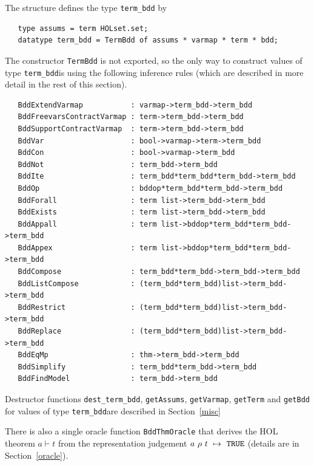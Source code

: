 \documentclass[12pt,fleqn]{article}
\renewcommand{\t}[1]{\mbox{\tt #1}}
\newcommand{\termbdd}[4]{\mbox{$#1~#2~#3~\mapsto~#4$}}
\newcommand\termbddty{\texttt{term\_bdd}{}}
\begin{document}
The structure  defines the type \termbddty{} by

\vspace*{-2mm}

\begin{verbatim}
   type assums = term HOLset.set;
   datatype term_bdd = TermBdd of assums * varmap * term * bdd;
\end{verbatim}

\vspace*{-2mm}

The constructor \t{TermBdd} is not exported, so the only way to construct
values of type \termbddty is using the following inference rules
(which are described in more detail in the rest of this section).

\begin{verbatim}
   BddExtendVarmap           : varmap->term_bdd->term_bdd
   BddFreevarsContractVarmap : term->term_bdd->term_bdd
   BddSupportContractVarmap  : term->term_bdd->term_bdd
   BddVar                    : bool->varmap->term->term_bdd
   BddCon                    : bool->varmap->term_bdd
   BddNot                    : term_bdd->term_bdd
   BddIte                    : term_bdd*term_bdd*term_bdd->term_bdd
   BddOp                     : bddop*term_bdd*term_bdd->term_bdd
   BddForall                 : term list->term_bdd->term_bdd
   BddExists                 : term list->term_bdd->term_bdd
   BddAppall                 : term list->bddop*term_bdd*term_bdd->term_bdd
   BddAppex                  : term list->bddop*term_bdd*term_bdd->term_bdd
   BddCompose                : term_bdd*term_bdd->term_bdd->term_bdd
   BddListCompose            : (term_bdd*term_bdd)list->term_bdd->term_bdd
   BddRestrict               : (term_bdd*term_bdd)list->term_bdd->term_bdd
   BddReplace                : (term_bdd*term_bdd)list->term_bdd->term_bdd
   BddEqMp                   : thm->term_bdd->term_bdd
   BddSimplify               : term_bdd*term_bdd->term_bdd
   BddFindModel              : term_bdd->term_bdd
\end{verbatim}

Destructor functions \t{dest\_term\_bdd}, \t{getAssums}, \t{getVarmap}, \t{getTerm}
and \t{getBdd} for values of type \termbddty are described in Section~\ref{misc}

There is also a single oracle function
\t{BddThmOracle} that derives the HOL theorem $a \vdash t$
from the representation judgement \termbdd{a}{\rho}{t}{\ml{TRUE}}
(details are in Section~\ref{oracle}).
\end{document}
